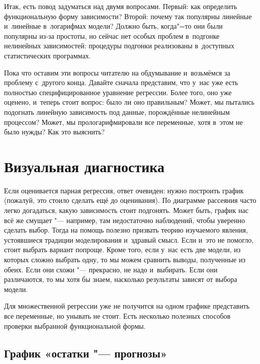 \documentclass[11pt]{article}
\begin{document}
Итак, есть повод задуматься над двумя вопросами. Первый: как определить функциональную форму зависимости? Второй: почему так популярны линейные и~линейные в~логарифмах модели? Должно быть, когда"=то они были популярны из-за простоты, но сейчас нет особых проблем в~подгонке нелинейных зависимостей: процедуры подгонки реализованы в~доступных статистических программах.

Пока что оставим эти вопросы читателю на обдумывание и~возьмёмся за проблему с~другого конца. Давайте сначала представим, что у~нас уже есть полностью специфицированное уравнение регрессии. Более того, оно уже оценено, и~теперь стоит вопрос: было ли оно правильным? Может, мы пытались подогнать линейную зависимость под данные, порождённые нелинейным процессом? Может, мы прологарифмировали все переменные, хотя в~этом не было нужды? Как это выяснить?

\section{Визуальная диагностика}

Если оценивается парная регрессия, ответ очевиден: нужно построить график (пожалуй, это стоило сделать ещё до оценивания). По диаграмме рассеяния часто легко догадаться, какую зависимость стоит подгонять. Может быть, график нас всё же смущает "--- например, там недостаточно наблюдений, чтобы уверенно сделать выбор. Тогда на помощь полезно призвать теорию изучаемого явления, устоявшиеся традиции моделирования и~здравый смысл. Если и~это не помогло, стоит выбрать вариант попроще. Кроме того, если у~нас есть две модели, из которых сложно выбрать одну, то мы можем сравнить выводы, полученные из обеих. Если они схожи "--- прекрасно, не надо и~выбирать. Если они различаются, то мы хотя бы знаем, насколько результаты зависят от выбора модели.

Для множественной регрессии уже не получится на одном графике представить все переменные, но унывать не стоит. Есть несколько полезных способов проверки выбранной функциональной формы.

\subsection{График «остатки "--- прогнозы»}
\end{document}

